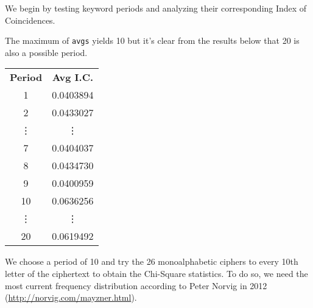 \documentclass[../hw_sols.tex]{subfiles}
\begin{document}
\begin{solution}

We begin by testing keyword periods and analyzing their corresponding Index of 
Coincidences.



\newpage

The maximum of \verb|avgs| yields 10 but it's clear from the results below 
that 20 is also a possible period.

\begin{minipage}{0.25\linewidth}
	\begin{tabular}{ c c }
		\textbf{Period} & \textbf{Avg I.C.} \\
		1 & 0.0403894 \\
		2 & 0.0433027 \\
		\vdots & \vdots \\
		7 & 0.0404037 \\
		8 & 0.0434730 \\
		9 & 0.0400959 \\
		\rowcolor{yellow!75} 10 & 0.0636256 \\
		\vdots & \vdots \\
		\rowcolor{yellow!75} 20 & 0.0619492
	\end{tabular}
\end{minipage}
\begin{minipage}{0.7\linewidth}
\end{minipage}

\vspace{0.5cm}

We choose a period of 10 and try the 26 monoalphabetic ciphers to every 10th 
letter of the ciphertext to obtain the Chi-Square statistics. To do so, we 
need the most current frequency distribution according to Peter Norvig in 
2012 (\url{http://norvig.com/mayzner.html}).


\end{solution}
\end{document}
